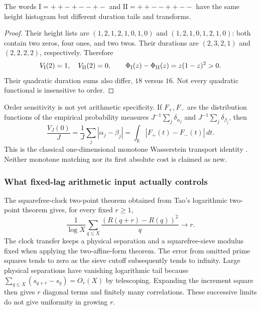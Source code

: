 \begin{proposition}
\label{prop:a12-order-example}
The words $\mathrm{I}=++-+--+-$ and $\mathrm{II}=++--++--$ have the same
height histogram but different duration tails and transforms.
\end{proposition}
\begin{proof}
Their height lists are $(1,2,1,2,1,0,1,0)$ and $(1,2,1,0,1,2,1,0)$:
both contain two zeros, four ones, and two twos.
Their durations are $(2,3,2,1)$ and $(2,2,2,2)$, respectively. Therefore
\begin{equation}
\label{eq:a12-order-separation}
V_{\rm I}(2)=1,\quad V_{\rm II}(2)=0,\qquad
\Phi_{\rm I}(z)-\Phi_{\rm II}(z)=z(1-z)^2>0.
\end{equation}
Their quadratic duration sums also differ, $18$ versus $16$.
Not every quadratic functional is insensitive to order.
\end{proof}

Order sensitivity is not yet arithmetic specificity. If $F_+,F_-$ are the
distribution functions of the empirical probability measures
$J^{-1}\sum_j\delta_{\alpha_j}$ and $J^{-1}\sum_j\delta_{\beta_j}$, then
\begin{equation}
\label{eq:a12-Wasserstein}
\frac{V_J(0)}J=\frac1J\sum_j|\alpha_j-\beta_j|
=\int_{\mathbb R}|F_+(t)-F_-(t)|\,dt.
\end{equation}
This is the classical one-dimensional monotone Wasserstein transport
identity \cite{Vallender1974}. Neither monotone matching nor its first
absolute cost is claimed as new.
\subsubsection{What fixed-lag arithmetic input actually controls}
\label{subsubsec:a12-local-input}
The squarefree-clock two-point theorem obtained from Tao's logarithmic
two-point theorem \cite{Tao2016} gives, for every fixed $r\ge1$,
\begin{equation}
\label{eq:a12-window-input}
\frac1{\log X}\sum_{q\le X}\frac{(R(q+r)-R(q))^2}{q}\longrightarrow r.
\end{equation}
The clock transfer keeps a physical separation and a squarefree-sieve
modulus fixed when applying the two-affine-form theorem.
The error from omitted prime squares tends to zero as the sieve cutoff
subsequently tends to infinity. Large physical separations have vanishing
logarithmic tail because
$\sum_{q\le X}(s_{q+r}-s_q)=O_r(X)$ by telescoping.
Expanding the increment square then gives $r$ diagonal terms and finitely
many correlations. These successive limits do not give uniformity in
growing $r$.

